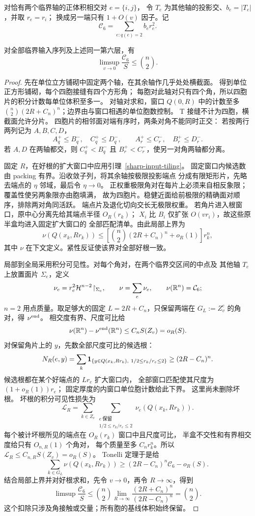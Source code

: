 对恰有两个临界轴的正体积相交对 \(e=\{i,j\}\)，
令 \(T_e\) 为其他轴的投影交、\(b_e=|T_e|\)，并取 \(r_e=r_i\)；
换成另一端只有 \(1+O(v)\) 因子。记
\[
 \mathcal C_6=\sum_{e:q(e)=2}b_er_e^2 .
\]
\begin{lemma}[余维二接触计数]\label{sharp-incidence}
对全部临界输入序列及上述同一第六层，有
\begin{equation}\label{sharp-incidence-bound}
 \limsup_{v\to0}\frac{\mathcal C_6}{S}\le\binom n2.
\end{equation}
\end{lemma}
\begin{proof}
先在单位立方铺砌中固定两个轴，在其余轴作几乎处处横截面。
得到单位正方形铺砌，每个四胞接缝有四个方形角；
每胞对此轴对只有四个角，所以四胞片的积分计数每单位体积至多一。
对轴对求和，窗口 \(Q(0,R)\) 中的计数至多
\(\binom n2(2R+C_n)^n\)；边界由与窗口相遇的单位胞数控制。
T 接缝不计为四胞，横截面允许分片。
四胞片的相邻面对端有序时，两条对角不能同时正交：
若按两行两列记为 \(A,B,C,D\)，
\[
 A_q^+\le B_q^-,\quad C_q^+\le D_q^-,
 \qquad A_r^+\le C_r^-,\quad B_r^+\le D_r^-.
\]
若 \(A,D\) 在两轴都交，则 \(C_q^+<B_q^-\) 且
\(B_r^+<C_r^-\)，使另一对角两轴都分离。

固定 \(R\)，在好根的扩大窗口中应用引理~\ref{sharp-input-tiling}。
固定窗口内候选数由 packing 有界。沿收敛子列，将其余轴按极限投影端点
分成有限矩形片，先略去端点的 \(\eta\) 邻域，最后令 \(\eta\to0\)。
正权重极限角对在每片上必须来自相反象限；覆盖性使另两象限亦由胞填满，
故为四胞片。稳健近面给前极限的精确面对顺序，排除两对角同活跃。
端点片及退化切向交长无极限权重。
若角片进入根窗口，原中心分离先给其端点半径 \(O_R(r_k)\)；
\(X_i\) 比 \(B_i\) 仅扩张 \(O(vr_i)\)，故这些原半盒均进入固定扩大窗口的
全部匹配清单。由此局部上界为
\[
 \nu(Q(x_k,Rr_k))
 \le\left[\binom n2(2R+C_n)^n+o_R(1)\right]r_k^n,
\]
其中 \(\nu\) 在下文定义。紧性反证使该界对全部好根一致。

局部到全局采用积分可见性。对每个角对，在两个临界交区间的中点及
其他轴 \(T_e\) 上放置面片 \(\Sigma_e\)，定义
\[
 \nu_e=r_e^2\mathcal H^{n-2}\!\restriction_{\Sigma_e},\qquad
 \nu=\sum_e\nu_e,\qquad \nu(\mathbb R^n)=\mathcal C_6;
\]
\(n=2\) 用点质量。取足够大的固定 \(L=2R+C_n\)，只保留两端在
\(G_L:=Z_v^c\) 的角对，得 \(\nu^{\rm end}\)。
相交度有界、尺度可比给
\[
 \nu(\mathbb R^n)-\nu^{\rm end}(\mathbb R^n)\le C_nS(Z_v)=o_R(S).
\]
对保留角片上的 \(y\)，先数全部尺度可比的候选根：
\[
 N_R(e,y)=\sum_k
 \mathbf 1_{\{y\in Q(x_k,Rr_k),\ 1/2\le r_k/r_e\le2\}}
 \ge(2R-C_n)^n.
\]
候选根都在某个好端点的 \(Lr_e\) 扩大窗口内，
全部窗口匹配使其尺度为 \((1+o_R(1))r_e\)；
固定厚度的内窗口单位胞计数给此下界。
这里尚未删除坏根。
坏根的积分可见性损失为
\[
 \mathcal L_R=
 \sum_{k\in Z_v}\sum_{\substack{e\ \text{保留}\\1/2\le r_k/r_e\le2}}
       \nu_e(Q(x_k,Rr_k)).
\]
每个被计坏根所见的端点在 \(O_R(r_k)\) 窗口中且尺度可比，
半盒不交性和有界相交度给只有 \(O_{n,R}(1)\) 个角对，
每个质量至多 \(C_nr_k^n\)。所以
\(\mathcal L_R\le C_{n,R}S(Z_v)=o_R(S)\)。
Tonelli 定理于是给
\[
 \sum_{k\in G_L}\nu(Q(x_k,Rr_k))
 \ge(2R-C_n)^n\mathcal C_6-o_R(S).
\]
结合局部上界并对好根求和，先令 \(v\to0\)，再令 \(R\to\infty\)，得到
\[
 \limsup\frac{\mathcal C_6}{S}
 \le\binom n2\lim_{R\to\infty}
       \frac{(2R+C_n)^n}{(2R-C_n)^n}=\binom n2.
\]
这个扣除只涉及角接触或交量；所有胞的基线体积始终保留。
\end{proof}

